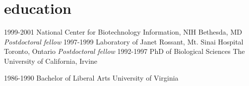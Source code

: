 \documentclass[]{dmc-cv} %
\begin{document}

\section{education}

\begin{entrylist}
\entry
{1999-2001}
{National Center for Biotechnology Information, NIH}
{Bethesda, MD}
{\emph{Postdoctoral fellow}
}
\entry
{1997-1999}
{Laboratory of Janet Rossant, Mt. Sinai Hospital}
{Toronto, Ontario}
{\emph{Postdoctoral fellow}
}
\entry
{1992-1997}
{PhD {\normalfont of Biological Sciences}}
{The University of California, Irvine}

\entry
{1986-1990}
{Bachelor {\normalfont of Liberal Arts}}
{University of Virginia}

\end{entrylist}




\end{document}
